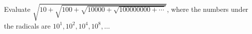 Evaluate $\sqrt{10+\sqrt{100+\sqrt{10000+\sqrt{100000000+\cdots}}}}$, where the numbers under the radicals are $10^1,10^2,10^4,10^8,\dots$
